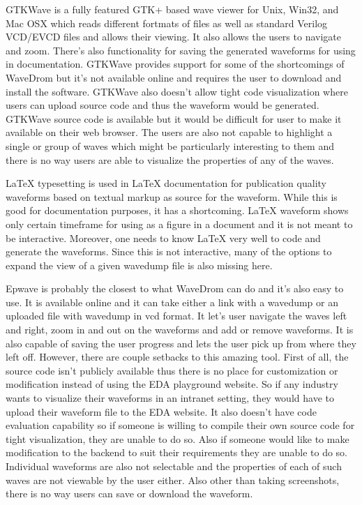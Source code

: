 \documentclass[14pt]{extarticle}
\begin{document}
\par GTKWave is a fully featured GTK+ based wave viewer for Unix, Win32, and Mac OSX which reads different fortmats of files as well as standard Verilog VCD/EVCD files and allows their viewing. It also allows the users to navigate and zoom. There's also functionality for saving the generated waveforms for using in documentation. GTKWave provides support for some of the shortcomings of WaveDrom but it’s not available online and requires the user to download and install the software. GTKWave also doesn't allow tight code visualization where users can upload source code and thus the waveform would be generated. GTKWave source code is available but it would be difficult for user to make it available on their web browser.  The users are also not capable to highlight a single or group of waves which might be particularly interesting to them and there is no way users are able to visualize the properties of any of the waves.
\par LaTeX typesetting is used in LaTeX documentation for publication quality waveforms based on textual markup as source for the waveform. While this is good for documentation purposes, it has a shortcoming. LaTeX waveform shows only certain timeframe for using as a figure in a document and it is not meant to be interactive. Moreover, one needs to know LaTeX very well to code and generate the waveforms. Since this is not interactive, many of the options to expand the view of a given wavedump file is also missing here.
\par Epwave is probably the closest to what WaveDrom can do and it's also easy to use. It is available online and it can take either a link with a wavedump or an uploaded file with wavedump in vcd format. It let's user navigate the waves left and right, zoom in and out on the waveforms and add or remove waveforms. It is also capable of saving the user progress and lets the user pick up from where they left off. However, there are couple setbacks to this amazing tool. First of all, the source code isn't publicly available thus there is no place for customization or modification instead of using the EDA playground website. So if any industry wants to visualize their waveforms in an intranet setting, they would have to upload their waveform file to the EDA website. It also doesn't have code evaluation capability so if someone is willing to compile their own source code for tight visualization, they are unable to do so. Also if someone would like to make modification to the backend to suit their requirements they are unable to do so. Individual waveforms are also not selectable and the properties of each of such waves are not viewable by the user either. Also other than taking screenshots, there is no way users can save or download the waveform.
\end{document}
